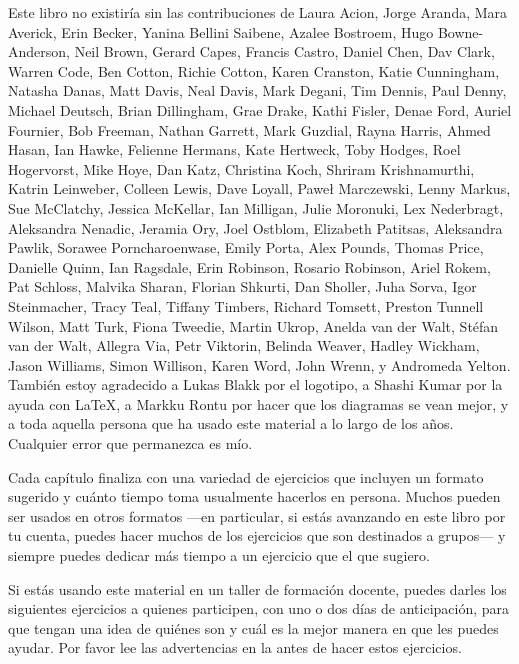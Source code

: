 
Este libro no existiría sin las contribuciones de
Laura Acion,
Jorge Aranda,
Mara Averick,
Erin Becker,
Yanina Bellini Saibene,
Azalee Bostroem,
Hugo Bowne-Anderson,
Neil Brown,
Gerard Capes,
Francis Castro,
Daniel Chen,
Dav Clark,
Warren Code,
Ben Cotton,
Richie Cotton,
Karen Cranston,
Katie Cunningham,
Natasha Danas,
Matt Davis,
Neal Davis,
Mark Degani,
Tim Dennis,
Paul Denny,
Michael Deutsch,
Brian Dillingham,
Grae Drake,
Kathi Fisler,
Denae Ford,
Auriel Fournier,
Bob Freeman,
Nathan Garrett,
Mark Guzdial,
Rayna Harris,
Ahmed Hasan,
Ian Hawke,
Felienne Hermans,
Kate Hertweck,
Toby Hodges,
Roel Hogervorst,
Mike Hoye,
Dan Katz,
Christina Koch,
Shriram Krishnamurthi,
Katrin Leinweber,
Colleen Lewis,
Dave Loyall,
Paweł Marczewski,
Lenny Markus,
Sue McClatchy,
Jessica McKellar,
Ian Milligan,
Julie Moronuki,
Lex Nederbragt,
Aleksandra Nenadic,
Jeramia Ory,
Joel Ostblom,
Elizabeth Patitsas,
Aleksandra Pawlik,
Sorawee Porncharoenwase,
Emily Porta,
Alex Pounds,
Thomas Price,
Danielle Quinn,
Ian Ragsdale,
Erin Robinson,
Rosario Robinson,
Ariel Rokem,
Pat Schloss,
Malvika Sharan,
Florian Shkurti,
Dan Sholler,
Juha Sorva,
Igor Steinmacher,
Tracy Teal,
Tiffany Timbers,
Richard Tomsett,
Preston Tunnell Wilson,
Matt Turk,
Fiona Tweedie,
Martin Ukrop,
Anelda van der Walt,
Stéfan van der Walt,
Allegra Via,
Petr Viktorin,
Belinda Weaver,
Hadley Wickham,
Jason Williams,
Simon Willison,
Karen Word,
John Wrenn,
y Andromeda Yelton.
También estoy agradecido a Lukas Blakk por el logotipo,
a Shashi Kumar por la ayuda con LaTeX,
a Markku Rontu por hacer que los diagramas se vean mejor,
y a toda aquella persona que ha usado este material a lo largo de los años.
Cualquier error que permanezca es mío. 


Cada capítulo finaliza con una variedad de ejercicios que incluyen un formato sugerido y cuánto tiempo toma usualmente hacerlos en persona.
Muchos pueden ser usados en otros formatos ---en particular,
si estás avanzando en este libro por tu cuenta,
puedes hacer muchos de los ejercicios que son destinados a grupos--- y siempre
puedes dedicar más tiempo a un ejercicio que el que sugiero.

Si estás usando este material en un taller de formación docente,
puedes darles los siguientes ejercicios a quienes participen, con uno o dos días de anticipación,
para que tengan una idea de quiénes son y cuál es la mejor manera en que les puedes ayudar. 
Por favor lee las advertencias en la  antes de hacer estos ejercicios.

